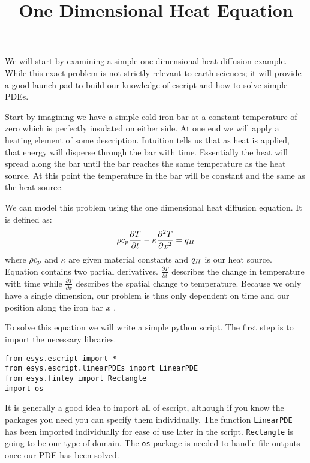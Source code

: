 \documentclass{manual}
\title{One Dimensional Heat Equation}
\begin{document}
We will start by examining a simple one dimensional heat diffusion example. While this exact problem is not strictly relevant to earth sciences; it will provide a good launch pad to build our knowledge of escript and how to solve simple PDEs.

Start by imagining we have a simple cold iron bar at a constant temperature of zero which is perfectly insulated on either side. At one end we will apply a heating element of some description. Intuition tells us that as heat is applied, that energy will disperse through the bar with time. Essentially the heat will spread along the bar until the bar reaches the same temperature as the heat source. At this point the temperature in the bar will be constant and the same as the heat source.

We can model this problem using the one dimensional heat diffusion equation. It is defined as:
\begin{equation}
\rho c\hackscore p \frac{\partial T}{\partial t} - \kappa \frac{\partial^{2} T}{\partial x^{2}} = q\hackscore H
\label{DIFFUSION TEMP EQ 1}
\end{equation}
where $\rho c\hackscore p$ and $\kappa$ are given material constants and $q\hackscore H$ is our heat source. Equation  contains two partial derivatives. $\frac{\partial T}{\partial t}$ describes the change in temperature with time while $\frac{\partial T}{\partial x}$ describes the spatial change to temperature. Because we only have a single dimension, our problem is thus only dependent on time and our position along the iron bar $x$ .

To solve this equation we will write a simple python script. The first step is to import the necessary libraries.
\begin{verbatim}
from esys.escript import *
from esys.escript.linearPDEs import LinearPDE
from esys.finley import Rectangle
import os
\end{verbatim}
It is generally a good idea to import all of escript, although if you know the packages you need you can specify them individually. The function \verb|LinearPDE| has been imported individually for ease of use later in the script. \verb|Rectangle| is going to be our type of domain. The \verb|os| package is needed to handle file outputs once our PDE has been solved.
\end{document}
